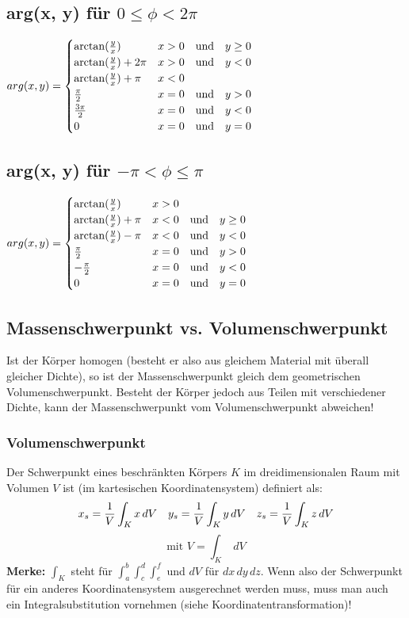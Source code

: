\subsection{arg(x, y) für $0 \leq \phi < 2\pi $}
$arg(x, y) =
\begin{cases}
	\arctan(\frac{y}{x})				& x > 0 \hspace{10pt} \text{und} \hspace{10pt} y \geq 0 \\
	\arctan(\frac{y}{x}) + 2\pi			& x > 0 \hspace{10pt} \text{und} \hspace{10pt} y < 0 \\
	\arctan(\frac{y}{x}) + \pi			& x < 0\\
	\frac{\pi}{2}						& x = 0 \hspace{10pt} \text{und} \hspace{10pt} y > 0\\
	\frac{3\pi}{2}						& x = 0 \hspace{10pt} \text{und} \hspace{10pt} y < 0\\
	0 									& x = 0 \hspace{10pt} \text{und} \hspace{10pt} y = 0
\end{cases}
$

\subsection{arg(x, y) für $-\pi < \phi \leq \pi$}
$arg(x, y) =
\begin{cases}
	\arctan(\frac{y}{x})				& x > 0 \\
	\arctan(\frac{y}{x}) + \pi			& x < 0 \hspace{10pt} \text{und} \hspace{10pt} y \geq 0 \\
	\arctan(\frac{y}{x}) - \pi			& x < 0 \hspace{10pt} \text{und} \hspace{10pt} y < 0 \\
	\frac{\pi}{2}						& x = 0 \hspace{10pt} \text{und} \hspace{10pt} y > 0\\
	-\frac{\pi}{2}						& x = 0 \hspace{10pt} \text{und} \hspace{10pt} y < 0\\
	0 									& x = 0 \hspace{10pt} \text{und} \hspace{10pt} y = 0
\end{cases}
$\\

\subsection{Massenschwerpunkt vs. Volumenschwerpunkt}
Ist der Körper homogen (besteht er also aus gleichem Material mit überall gleicher Dichte), so ist der Massenschwerpunkt gleich dem geometrischen Volumenschwerpunkt. Besteht der Körper jedoch aus Teilen mit verschiedener Dichte, kann der Massenschwerpunkt vom Volumenschwerpunkt abweichen!

\subsubsection{Volumenschwerpunkt}
Der Schwerpunkt eines beschränkten Körpers $K$ im dreidimensionalen Raum mit Volumen $V$ ist (im kartesischen Koordinatensystem) definiert als:
\[
	x_s = \frac{1}{V} \int_K x \, dV \hspace{10pt} y_s = \frac{1}{V} \int_K y \, dV \hspace{10pt} z_s = \frac{1}{V} \int_K z \, dV
\]
\[
	\text{mit } V = \int_K \; dV
\]
\textbf{Merke:} 
$\int_K$ steht für $\int_a^b \int_c^d \int_e^f$ und $dV$ für $dx \,dy \, dz$. Wenn also der Schwerpunkt für ein anderes Koordinatensystem ausgerechnet werden muss, muss man auch ein Integralsubstitution vornehmen (siehe Koordinatentransformation)!

